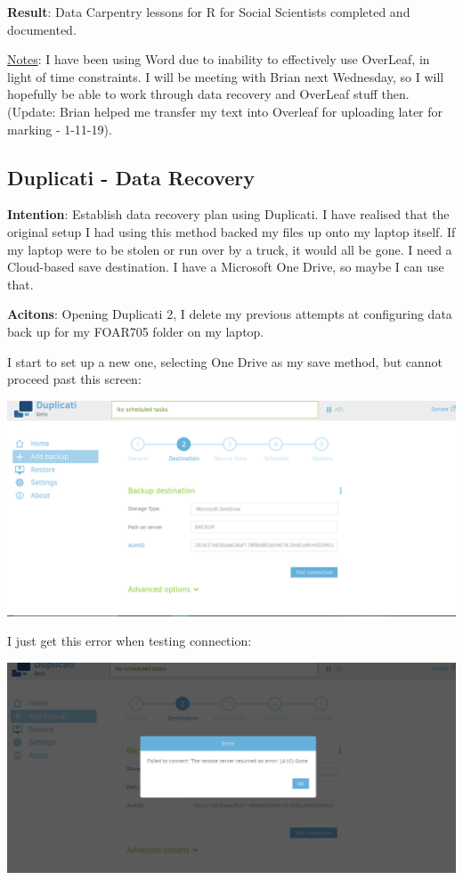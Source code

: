 \documentclass{article}
\begin{document}
\textbf{Result}: Data Carpentry lessons for R for Social Scientists completed and documented.

\underline{Notes}: I have been using Word due to inability to effectively use OverLeaf, in light of time constraints. I will be meeting with Brian next Wednesday, so I will hopefully be able to work through data recovery and OverLeaf stuff then. (Update: Brian helped me transfer my text into Overleaf for uploading later for marking - 1-11-19).

\subsection{Duplicati - Data Recovery}

\textbf{Intention}: Establish data recovery plan using Duplicati. I have realised that the original setup I had using this method backed my files up onto my laptop itself. If my laptop were to be stolen or run over by a truck, it would all be gone. I need a Cloud-based save destination. I have a Microsoft One Drive, so maybe I can use that.

\textbf{Acitons}: Opening Duplicati 2, I delete my previous attempts at configuring data back up for my FOAR705 folder on my laptop.

{\item I start to set up a new one, selecting One Drive as my save method, but cannot proceed past this screen:}

\includegraphics[width=1.0\textwidth]{duplicati_31.PNG}

I just get this error when testing connection: 

\includegraphics[width=1.0\textwidth]{duplicati_32.PNG}
\end{document}
